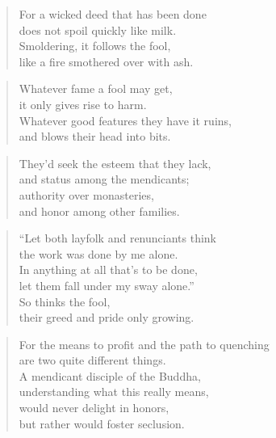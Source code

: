 \documentclass[12pt,openany]{book}%
\begin{document}
\begin{verse}%
For a wicked deed that has been done \\
does not spoil quickly like milk. \\
Smoldering, it follows the fool, \\
like a fire smothered over with ash. 

%
\end{verse}

\begin{verse}%
Whatever fame a fool may get, \\
it only gives rise to harm. \\
Whatever good features they have it ruins, \\
and blows their head into bits. 

%
\end{verse}

\begin{verse}%
They’d seek the esteem that they lack, \\
and status among the mendicants; \\
authority over monasteries, \\
and honor among other families. 

%
\end{verse}

\begin{verse}%
“Let both layfolk and renunciants think \\
the work was done by me alone. \\
In anything at all that’s to be done, \\
let them fall under my sway alone.” \\
So thinks the fool, \\
their greed and pride only growing. 

%
\end{verse}

\begin{verse}%
For the means to profit and the path to quenching \\
are two quite different things. \\
A mendicant disciple of the Buddha, \\
understanding what this really means, \\
would never delight in honors, \\
but rather would foster seclusion. 

%
\end{verse}
\end{document}
